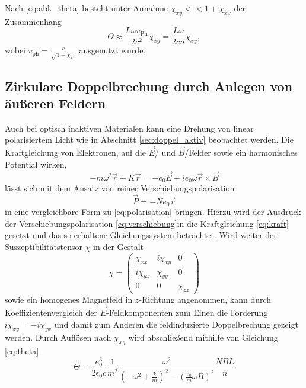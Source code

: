 Nach \eqref{eq:abk_theta} besteht unter Annahme $\chi_{xy} << 1 + \chi_{xx}$ der Zusammenhang
\begin{equation}
    \Theta \approx \frac{L\omega v_\text{Ph}}{2c^2}\chi_{xy} = \frac{L\omega}{2cn}\chi_{xy},
    \label{eq:theta}
\end{equation}
wobei $v_\text{ph} = \frac{c}{\sqrt{1+\chi_{xx}}}$ ausgenutzt wurde.
\subsection{Zirkulare Doppelbrechung durch Anlegen von äußeren Feldern}
Auch bei optisch inaktiven Materialen kann eine Drehung von linear polarisiertem Licht wie in Abschnitt \ref{sec:doppel_aktiv} beobachtet werden.
Die Kraftgleichung von Elektronen, auf die $\vec E$\-/ und $\vec B$\-/Felder sowie ein harmonisches Potential wirken,
\begin{equation}
    -m\omega^2\vec r + K \vec r = -e_0 \vec E + i e_0 \omega \vec r \times \vec B
    \label{eq:kraft}
\end{equation}
lässt sich mit dem Ansatz von reiner Verschiebungspolarisation
\begin{equation}
    \vec P = - N e_0 \vec r
    \label{eq:verschiebung}
\end{equation}
in eine vergleichbare Form zu \eqref{eq:polarisation} bringen.
Hierzu wird der Ausdruck der Verschiebungspolarisation \eqref{eq:verschiebung}in die Kraftgleichung \eqref{eq:kraft} gesetzt und das so erhaltene Gleichungssystem betrachtet.
Wird weiter der Suszeptibilitätstensor $\chi$ in der Gestalt
\begin{equation}
    \chi = \begin{pmatrix} \chi_{xx} & i\chi_{xy} & 0 \\ i\chi_{yx} & \chi_{yy} & 0\\ 0 & 0 & \chi_{zz} \end{pmatrix}
\end{equation}
sowie ein homogenes Magnetfeld in $z$-Richtung angenommen, kann durch Koeffizientenvergleich der $\vec E$-Feldkomponenten zum Einen die Forderung $i\chi_{xy}=-i\chi_{yx}$ und damit zum Anderen die feldinduzierte Doppelbrechung gezeigt werden.
Durch Auflösen nach $\chi_{xy}$ wird abschließend mithilfe von Gleichung \eqref{eq:theta}
\begin{equation}
    \Theta = \frac{e_0^3}{2\epsilon_0 c}\frac{1}{m^2} \frac{\omega^2}{(-\omega^2+\frac{k}{m})^2-(\frac{e_0}{m}\omega B)^2} \frac{NBL}{n}
    \label{theta_1}
\end{equation}
